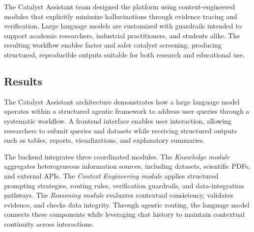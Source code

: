 The Catalyst Assistant team designed the platform using context-engineered modules that explicitly minimize hallucinations through evidence tracing and verification. Large language models are customized with guardrails intended to support academic researchers, industrial practitioners, and students alike. The resulting workflow enables faster and safer catalyst screening, producing structured, reproducible outputs suitable for both research and educational use.


\subsection*{Results}

The Catalyst Assistant architecture demonstrates how a large language model operates within a structured agentic framework to address user queries through a systematic workflow. A frontend interface enables user interaction, allowing researchers to submit queries and datasets while receiving structured outputs such as tables, reports, visualizations, and explanatory summaries.

The backend integrates three coordinated modules. The \textit{Knowledge module} aggregates heterogeneous information sources, including datasets, scientific PDFs, and external APIs. The \textit{Context Engineering module} applies structured prompting strategies, routing rules, verification guardrails, and data-integration pathways. The \textit{Reasoning module} evaluates contextual consistency, validates evidence, and checks data integrity. Through agentic routing, the language model connects these components while leveraging chat history to maintain contextual continuity across interactions.

